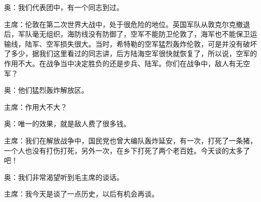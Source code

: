 奥：我们代表团中，有一个同志到过。

主席：伦敦在第二次世界大战中，处于很危险的地位。英国军队从敦克尔克撤退后，军队毫无组织，海防线没有防御了，空军不能防卫伦敦了，海军也不能保卫运输线，陆军、空军损失很大。当时，希特勒的空军猛烈轰炸伦敦，可是并没有破坏了多少，据我们这里看过的同志讲，后方陆海空军很快就恢复了，所以说，空军的作用不大。在战争当中决定胜负的还是步兵、陆军。你们在战争中，敌人有无空军？

奥：他们猛烈轰炸解放区。

主席：作用大不大？

奥：唯一的效果，就是敌人费了很多钱。

主席：我们在解放战争中，国民党也曾大编队轰炸延安，有一次，打死了一条猪，一个人也没有打伤打死，另外一次，在乡下打死了两个老百姓。今天谈的太多了吧！

奥：我们非常渴望听到毛主席的谈话。

主席：我今天是谈了一点历史，以后有机会再谈。


